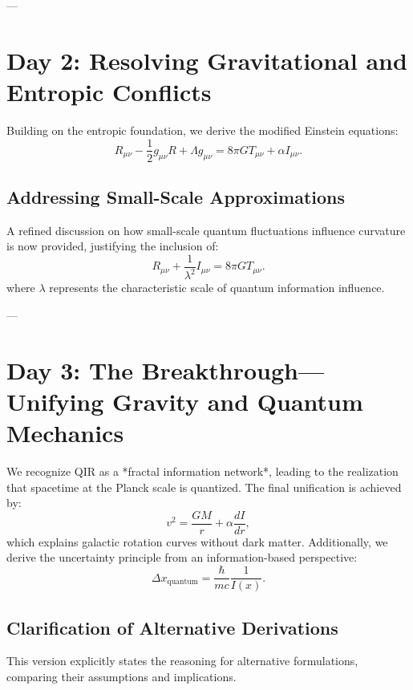 \documentclass{article}
\begin{document}
---

\section{Day 2: Resolving Gravitational and Entropic Conflicts}
Building on the entropic foundation, we derive the modified Einstein equations:
\begin{equation}
    R_{\mu \nu} - \frac{1}{2} g_{\mu \nu} R + \Lambda g_{\mu \nu} = 8 \pi G T_{\mu \nu} + \alpha I_{\mu \nu}.
\end{equation}

\subsection{Addressing Small-Scale Approximations}
A refined discussion on how small-scale quantum fluctuations influence curvature is now provided, justifying the inclusion of:
\begin{equation}
    R_{\mu \nu} + \frac{1}{\lambda^2} I_{\mu \nu} = 8 \pi G T_{\mu \nu}.
\end{equation}
where \( \lambda \) represents the characteristic scale of quantum information influence.

---

\section{Day 3: The Breakthrough—Unifying Gravity and Quantum Mechanics}
We recognize QIR as a *fractal information network*, leading to the realization that spacetime at the Planck scale is quantized. The final unification is achieved by:
\begin{equation}
    v^2 = \frac{G M}{r} + \alpha \frac{dI}{dr},
\end{equation}
which explains galactic rotation curves without dark matter. Additionally, we derive the uncertainty principle from an information-based perspective:
\begin{equation}
    \Delta x_{\text{quantum}} = \frac{\hbar}{m c} \frac{1}{I(x)}.
\end{equation}

\subsection{Clarification of Alternative Derivations}
This version explicitly states the reasoning for alternative formulations, comparing their assumptions and implications.
\end{document}

